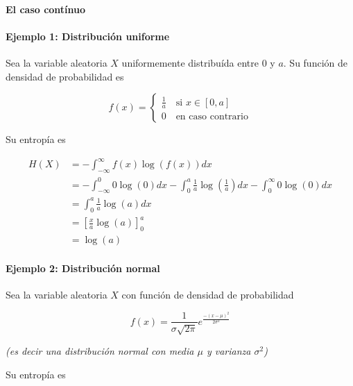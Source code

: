 \begin{figure}[htbp!]
\centering

\end{figure}


\paragraph{El caso contínuo}\label{el-caso-contuxednuo}

\paragraph{Ejemplo 1: Distribución
uniforme}\label{ejemplo-1-distribuciuxf3n-uniforme}

Sea la variable aleatoria \(X\) uniformemente distribuída entre \(0\) y
\(a\). Su función de densidad de probabilidad es

\[
f(x)=\begin{cases}
\frac{1}{a}\quad\text{si }x\in\left[0,a\right]\\
0\quad\text{en caso contrario}
\end{cases}
\]

Su entropía es

\begin{align*}
H(X) &= -\int_{-\infty}^\infty f(x)\log\left(f(x)\right)dx\\
&= -\int_{-\infty}^0 0\log(0)dx - \int_0^a \frac{1}{a}\log\left(\frac{1}{a}\right)dx - \int_0^{\infty} 0\log(0)dx\\
&= \int_0^a \frac{1}{a}\log(a)dx\\
&= \left[\frac{x}{a}\log(a)\right]_0^a\\
&= \log(a)
\end{align*}


\paragraph{Ejemplo 2: Distribución
normal}\label{ejemplo-2-distribuciuxf3n-normal}

Sea la variable aleatoria \(X\) con función de densidad de probabilidad

\[
f(x) = \frac{1}{\sigma\sqrt{2\pi}}e^{\frac{-(x-\mu)^2}{2\sigma^2}}
\]

\emph{(es decir una distribución normal con media \(\mu\) y varianza
\(\sigma^2\))}

Su entropía es


